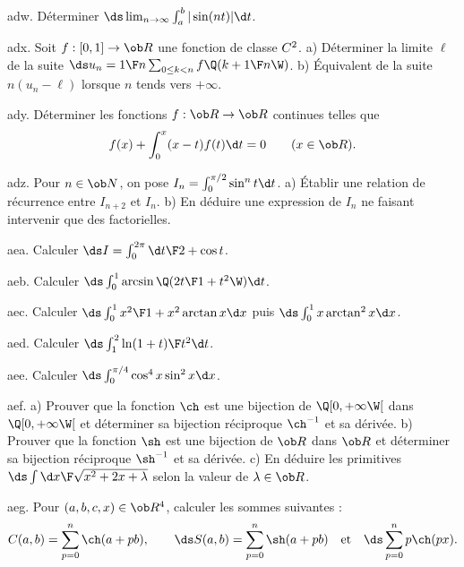 \exo [Level=1,Fight=2,Learn=2,Field=\Intégrales,Type=\Exercices,Origin=\MP] adw. 
 Déterminer $\ds\lim_{n\to\infty}\int_a^b|\sin (nt)|\d t$. 

\exo [Level=1,Fight=1,Learn=2,Field=\SommesDeRiemann,Type=\Exercices,Origin=\MP] adx. 
Soit $f:[0,1]\to\ob R$ une fonction de classe $\sc C^2$. \pn
a) Déterminer la limite $\ell$ de la suite $\ds u_n={1\F n}\sum_{0\le k< n}f\Q({k+1\F n}\W)$. \pn
b) \'Equivalent de la suite $n(u_n-\ell)$ lorsque $n$ tends vers $+\infty$. 
 
\exo [Level=1,Fight=2,Learn=1,Field=\Intégrales,Type=\Exercices,Origin=\MP]  ady. 
Déterminer les fonctions $f:\ob R\to\ob R$ continues telles que 
$$
f(x)+\int_0^x(x-t)f(t)\d t=0\qquad(x\in\ob R).
$$

\exo [Level=1,Fight=2,Learn=2,Field=\Intégrales,Type=\Exercices,Origin=]  adz. 
Pour $n\in\ob N$, on pose $I_n=\int_0^{\pi/2}\sin^nt\d t$. \pn
a) \'Etablir une relation de récurrence entre $I_{n+2}$ et $I_n$. \pn
b) En déduire une expression de $I_n$ ne faisant intervenir que des factorielles. 

\exo [Level=1,Fight=0,Learn=0,Field=\Intégrales,Type=\Exercices,Origin=]  aea. 
Calculer $\ds I=\int_0^{2\pi}{\d t\F2+\cos t}$. 

\exo [Level=1,Fight=1,Learn=0,Field=\Intégrales,Type=\Exercices,Origin=] aeb. 
Calculer $\ds \int_0^1\arcsin\Q({2t\F1+t^2}\W)\d t$. 

\exo [Level=1,Fight=2,Learn=1,Field=\Intégrales,Type=\Exercices,Origin=] aec. 
Calculer $\ds \int_0^1{x^2\F 1+x^2}\arctan x\d x$ puis $\ds\int_0^1x\arctan^2x\d x$. 

\exo [Level=1,Fight=1,Learn=0,Field=\Intégrales,Type=\Exercices,Origin=] aed. 
Calculer $\ds \int_1^2{\ln(1+t)\F t^2}\d t$. 

\exo [Level=1,Fight=0,Learn=0,Field=\Intégrales,Type=\Exercices,Origin=] aee. 
Calculer $\ds \int_0^{\pi/4}\cos^4x\sin^2x\d x$. 

\exo [Level=1,Fight=2,Learn=2,Field=\Fonctions,Type=\Cours,Origin=] aef. 
a) Prouver que la fonction $\ch$ est une bijection de $\Q[0,+\infty\W[$ dans $\Q[0,+\infty\W[$ 
et déterminer sa bijection réciproque $\ch^{-1}$ et sa dérivée. \pn
b) Prouver que la fonction $\sh$ est une bijection de $\ob R$ dans $\ob R$ et 
déterminer sa bijection réciproque $\sh^{-1}$ et sa dérivée.  \pn
c) En déduire les primitives $\ds \int{\d x\F\sqrt{x^2+2x+\lambda}}$ selon la valeur de $\lambda\in\ob R$. 

\exo [Level=1,Fight=0,Learn=0,Field=\TrigonométrieHyperbolique,Type=\Exercices,Origin=] aeg. 
Pour $(a,b,c,x)\in\ob R^4$, calculer les sommes suivantes : 
$$
C(a,b)=\sum_{p=0}^n\ch(a+pb), \qquad\ds S(a,b)=\sum_{p=0}^n\sh(a+pb)\quad\hbox{et}\quad
\ds \sum_{p=0}^np\ch(px).
$$ 

